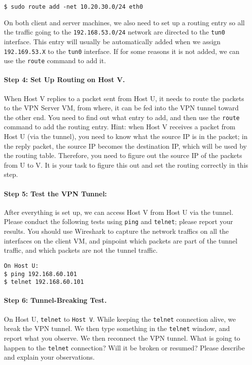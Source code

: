 \begin{lstlisting}
$ sudo route add -net 10.20.30.0/24 eth0
\end{lstlisting}


On both client and server machines, we also need to 
set up a routing entry so all the traffic going to the \texttt{192.168.53.0/24}
network are directed to the \texttt{tun0} interface. This entry will usually be 
automatically added when we assign \texttt{192.169.53.X} to
the \texttt{tun0} interface.  If for some reasons it is not added, 
we can use the \texttt{route}  command to add it.




\paragraph{Step 4: Set Up Routing on Host V.} 
When Host V replies to a packet sent from Host U, it needs to route the
packets to the VPN Server VM, from where, it can be fed into
the VPN tunnel toward the other end. You need to find out what entry to
add, and then use  the \texttt{route} command to add the routing entry. 
Hint: when Host V receives a packet from Host U (via the tunnel), you need to know what the
source IP is in the packet; in the reply packet, the source IP becomes the
destination IP, which will be used by the routing table. Therefore, you
need to figure out the source IP of the packets from U to V. It is your
task to figure this out and set the routing correctly in this step.


\paragraph{Step 5: Test the VPN Tunnel:} After everything is set up, we can 
access Host V from Host U via the tunnel. 
Please conduct the following tests using \texttt{ping} and \texttt{telnet}; 
please  report your results. You should use Wireshark to 
capture the network traffics on all the interfaces on the client VM, 
and pinpoint which packets are part of the tunnel traffic, and
which packets are not the tunnel traffic. 

\begin{lstlisting}
On Host U:
$ ping 192.168.60.101
$ telnet 192.168.60.101
\end{lstlisting}


\paragraph{Step 6: Tunnel-Breaking Test.} 
On Host U, \texttt{telnet} to \texttt{Host V}. While keeping the
\texttt{telnet} connection alive, we break the VPN tunnel. We then type something
in the \texttt{telnet} window, and report what you observe. 
We then reconnect the VPN tunnel. What is going to happen to the
\texttt{telnet} connection? Will it be broken or resumed?
Please describe and explain your observations. 



